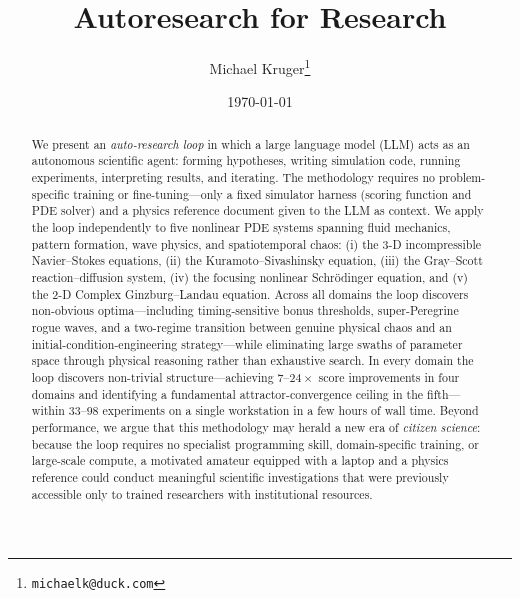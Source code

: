 \documentclass[11pt]{article}
\title{\textbf{Autoresearch for Research}}
\author{
  Michael Kruger\thanks{\texttt{michaelk@duck.com}}
}
\date{\today}
\begin{document}
\maketitle

\vspace{-0.5em}
\noindent{}
\vspace{0.5em}

\begin{abstract}
We present an \emph{auto-research loop} in which a large language model (LLM)
acts as an autonomous scientific agent: forming hypotheses, writing simulation
code, running experiments, interpreting results, and iterating.
The methodology requires no problem-specific training or fine-tuning---only
a fixed simulator harness (scoring function and PDE solver) and a physics
reference document given to the LLM as context.
We apply the loop independently to five nonlinear PDE systems spanning
fluid mechanics, pattern formation, wave physics, and spatiotemporal chaos:
(i) the 3-D incompressible Navier--Stokes equations,
(ii) the Kuramoto--Sivashinsky equation,
(iii) the Gray--Scott reaction--diffusion system,
(iv) the focusing nonlinear Schr\"odinger equation,
and (v) the 2-D Complex Ginzburg--Landau equation.
Across all domains the loop discovers non-obvious optima---including
timing-sensitive bonus thresholds, super-Peregrine rogue waves, and
a two-regime transition between genuine physical chaos and an
initial-condition-engineering strategy---while eliminating large swaths
of parameter space through physical reasoning rather than exhaustive search.
In every domain the loop discovers non-trivial structure---achieving
$7$--$24\times$ score improvements in four domains and identifying
a fundamental attractor-convergence ceiling in the fifth---within
$33$--$98$ experiments on a single workstation in a few hours of wall time.
Beyond performance, we argue that this methodology may herald a new era of
\emph{citizen science}: because the loop requires no specialist programming
skill, domain-specific training, or large-scale compute, a motivated amateur
equipped with a laptop and a physics reference could conduct meaningful
scientific investigations that were previously accessible only to trained
researchers with institutional resources.
\end{abstract}
\end{document}
